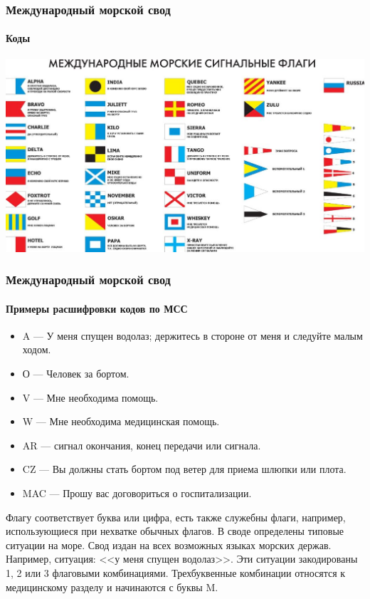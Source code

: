 \begin{frame}
    \frametitle{Международный морской свод}
    \framesubtitle{Коды}
    
    \begin{center}
        \includegraphics[width=.95\textwidth]{fig/signalFlagsCode}
    \end{center}
\end{frame}

\begin{frame}
    \frametitle{Международный морской свод}
    \framesubtitle{Примеры расшифровки кодов по МСС}
    
    \begin{itemize}
        \item A --- У меня спущен водолаз; держитесь в стороне от меня и следуйте малым ходом.
        \item О --- Человек за бортом.
        \item V --- Мне необходима помощь.
        \item W --- Мне необходима медицинская помощь.
        \item AR --- сигнал окончания, конец передачи или сигнала.
        \item CZ --- Вы должны стать бортом под ветер для приема шлюпки или плота.
        \item MAC --- Прошу вас договориться о госпитализации.
    \end{itemize}
\end{frame}

Флагу соответствует буква или цифра, есть также служебны флаги, например, использующиеся при нехватке обычных флагов.
В своде определены типовые ситуации на море. Свод издан на всех возможных языках морских держав. Например, ситуация: <<у меня спущен водолаз>>. Эти ситуации закодированы 1, 2 или 3 флаговыми комбинациями. Трехбуквенные комбинации относятся к медицинскому разделу и начинаются с буквы M.

